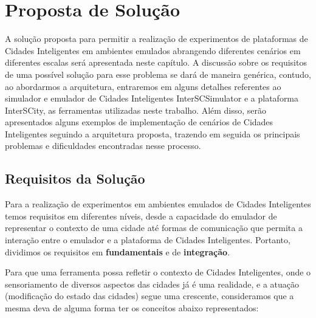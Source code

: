 \chapter{Proposta de Solução}
\label{cap:proposta}

A solução proposta para permitir a realização de experimentos de plataformas de Cidades Inteligentes em ambientes emulados abrangendo diferentes cenários em diferentes escalas será
apresentada neste capítulo.
A discussão sobre os requisitos de uma possível solução para esse problema se dará de maneira genérica, contudo, ao abordarmos a arquitetura, entraremos em alguns detalhes referentes ao
simulador e emulador de Cidades Inteligentes InterSCSimulator e a plataforma InterSCity, as ferramentas utilizadas neste trabalho.
Além disso, serão apresentados alguns exemplos de implementação de cenários de Cidades Inteligentes seguindo a arquitetura proposta, trazendo em seguida os principais problemas e
dificuldades encontradas nesse processo.

\section{Requisitos da Solução}

Para a realização de experimentos em ambientes emulados de Cidades Inteligentes temos requisitos em diferentes níveis, desde a capacidade do emulador de representar o contexto
de uma cidade até formas de comunicação que permita a interação entre o emulador e a plataforma de Cidades Inteligentes.
Portanto, dividimos os requisitos em \textbf{fundamentais} e de \textbf{integração}.

Para que uma ferramenta possa refletir o contexto de Cidades Inteligentes, onde o sensoriamento de diversos aspectos das cidades já é uma realidade, e a atuação (modificação do estado
das cidades) segue uma crescente, consideramos que a mesma deva de alguma forma ter os conceitos abaixo representados:

